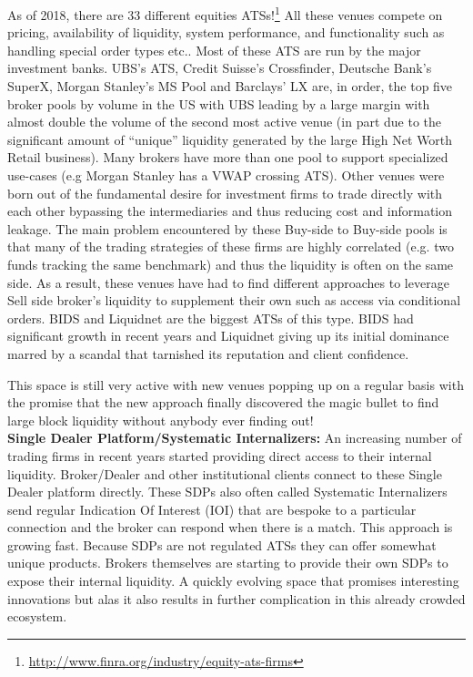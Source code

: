 As of 2018, there are 33 different equities ATSs!\footnote{\url{http://www.finra.org/industry/equity-ats-firms}} All these venues compete on pricing, availability of liquidity, system performance, and functionality such as handling special order types etc.. Most of these ATS are run by the major investment banks. UBS's ATS, Credit Suisse's Crossfinder, Deutsche Bank's SuperX, Morgan Stanley's MS Pool and Barclays' LX are, in order,  the top five broker pools by volume in the US with UBS leading by a large margin with almost double the volume of the second most active venue (in part due to the significant amount of ``unique'' liquidity generated by the large High Net Worth Retail business).  Many brokers have more than one pool to support specialized use-cases (e.g Morgan Stanley has a VWAP crossing ATS). Other venues were born out of the fundamental desire for investment firms to trade directly with each other bypassing the intermediaries and  thus reducing cost and information leakage.  The main problem encountered by these Buy-side to Buy-side pools is that many of the trading strategies of these firms are highly correlated (e.g. two funds tracking the same benchmark) and thus the liquidity is often on the same side. As a result, these venues have had to find different approaches to leverage Sell side broker's liquidity to supplement their own such as access via conditional orders. BIDS and Liquidnet  are the biggest ATSs of this type. BIDS had significant growth in recent years and Liquidnet giving up its initial dominance marred by a scandal that tarnished its reputation and client confidence.


This space is still very active with new venues popping up on a regular basis with the promise that the new approach finally discovered the magic bullet to find large block liquidity without anybody ever finding out! \\


\noindent\textbf{Single Dealer Platform/Systematic Internalizers:} An increasing number of trading firms in recent years started providing direct access to their internal liquidity. Broker/Dealer and other institutional clients connect to these Single Dealer platform directly. These SDPs also often called Systematic Internalizers send regular Indication Of Interest (IOI)  that are bespoke to a particular connection and the broker can respond when there is a match. This approach is growing fast. Because SDPs are not regulated ATSs they can offer somewhat unique products. Brokers themselves are starting to provide their own SDPs to expose their internal liquidity. A quickly evolving space that promises interesting innovations but alas it also results in further complication in this already crowded ecosystem. \\


